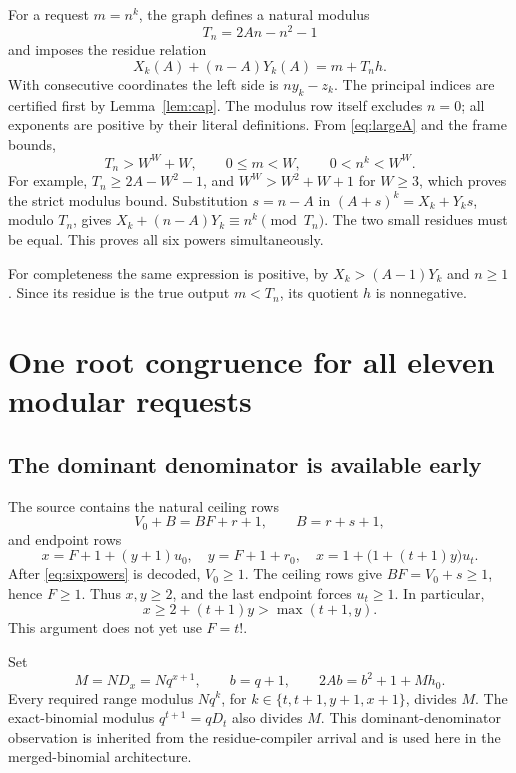 \documentclass[11pt,a4paper]{article}
\theoremstyle{remark}
\begin{document}
For a request \(m=n^k\), the graph defines a natural modulus
\[
 T_n=2An-n^2-1
\]
and imposes the residue relation
\[
 X_k(A)+(n-A)Y_k(A)=m+T_nh.
\]
With consecutive coordinates the left side is \(ny_k-z_k\).
The principal indices are certified first by Lemma~\ref{lem:cap}.
The modulus row itself excludes \(n=0\); all exponents are positive by
their literal definitions. From \eqref{eq:largeA} and the frame bounds,
\[
 T_n>W^W+W,\qquad 0\le m<W,\qquad 0<n^k<W^W.
\]
For example, \(T_n\ge2A-W^2-1\), and
\(W^W>W^2+W+1\) for \(W\ge3\), which proves the strict modulus bound.
Substitution \(s=n-A\) in \((A+s)^k=X_k+Y_ks\), modulo \(T_n\), gives
\(X_k+(n-A)Y_k\equiv n^k\pmod{T_n}\). The two small residues must be
equal. This proves all six powers simultaneously.

For completeness the same expression is positive, by
\(X_k>(A-1)Y_k\) and \(n\ge1\). Since its residue is the true output
\(m<T_n\), its quotient \(h\) is nonnegative.

\section{One root congruence for all eleven modular requests}

\subsection{The dominant denominator is available early}

The source contains the natural ceiling rows
\begin{equation}\label{eq:ceiling}
 V_0+B=BF+r+1,\qquad B=r+s+1,
\end{equation}
and endpoint rows
\begin{equation}\label{eq:endpoints}
 x=F+1+(y+1)u_0,\quad y=F+1+r_0,\quad
 x=1+\bigl(1+(t+1)y\bigr)u_t.
\end{equation}
After \eqref{eq:sixpowers} is decoded, \(V_0\ge1\). The ceiling rows give
\(BF=V_0+s\ge1\), hence \(F\ge1\). Thus \(x,y\ge2\), and the last
endpoint forces \(u_t\ge1\). In particular,
\begin{equation}\label{eq:dominates}
 x\ge2+(t+1)y>\max(t+1,y).
\end{equation}
This argument does not yet use \(F=t!\).

Set
\begin{equation}\label{eq:rootmod}
 M=ND_x=Nq^{x+1},\qquad b=q+1,
 \qquad 2Ab=b^2+1+Mh_0.
\end{equation}
Every required range modulus \(Nq^k\), for
\(k\in\{t,t+1,y+1,x+1\}\), divides \(M\). The exact-binomial modulus
\(q^{t+1}=qD_t\) also divides \(M\). This dominant-denominator
observation is inherited from the residue-compiler arrival
\cite{residuecompiler} and is used here in the merged-binomial architecture.
\end{document}
